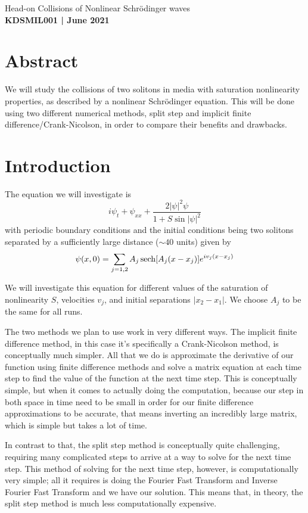 \documentclass[12pt]{article}
\numberwithin{equation}{section}
\numberwithin{figure}{section}
\numberwithin{table}{section}
\begin{document}
\begin{center}
    {\huge Head-on Collisions of Nonlinear Schr\"odinger waves}\\
    \vspace{0.2in}
    \textbf{KDSMIL001 | June 2021}

    \section*{Abstract}\label{sec:Abstract}
    We will study the collisions of two solitons in media with saturation nonlinearity properties, as described by a nonlinear Schr\"odinger equation. This will be done using two different numerical methods, split step and implicit finite difference/Crank-Nicolson, in order to compare their benefits and drawbacks.
\end{center}

\section{Introduction}\label{sec:Introduction}
\par The equation we will investigate is 
\begin{equation}
    i\psi_t+\psi_{xx}+\frac{2|\psi|^2\psi}{1+S\sin|\psi|^2}
    \label{eqn:Main}
\end{equation}
with periodic boundary conditions and the initial conditions being two solitons separated by a sufficiently large distance ($\sim40$ units) given by
\begin{equation}
    \psi(x,0)=\sum_{j=1,2}A_j\sech[A_j(x-x_j)]e^{iv_j(x-x_j)}
    \label{eqn:IC}
\end{equation}
\par We will investigate this equation for different values of the saturation of nonlinearity $S$, velocities $v_j$, and initial separations $|x_2-x_1|$. We choose $A_j$ to be the same for all runs.
\par The two methods we plan to use work in very different ways. The implicit finite difference method, in this case it's specifically a Crank-Nicolson method, is conceptually much simpler. All that we do is approximate the derivative of our function using finite difference methods and solve a matrix equation at each time step to find the value of the function at the next time step. This is conceptually simple, but when it comes to actually doing the computation, because our step in both space in time need to be small in order for our finite difference approximations to be accurate, that means inverting an incredibly large matrix, which is simple but takes a lot of time.
\par In contrast to that, the split step method is conceptually quite challenging, requiring many complicated steps to arrive at a way to solve for the next time step. This method of solving for the next time step, however, is computationally very simple; all it requires is doing the Fourier Fast Transform and Inverse Fourier Fast Transform and we have our solution. This means that, in theory, the split step method is much less computationally expensive. 
\end{document}
